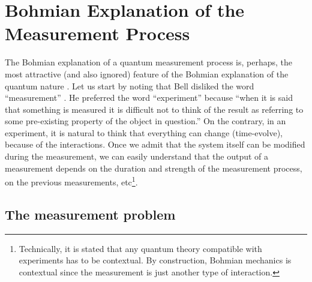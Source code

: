 \documentclass[nofootinbib, secnumarabic, amsmath, nobibnotes,11pt,aps,pra, floatfix]{revtex4-1}
\begin{document}
\section{Bohmian Explanation of the Measurement Process}\label{om.sec_measurement}

The Bohmian explanation of a quantum measurement process is, perhaps, the most attractive (and also ignored) feature of the Bohmian explanation of the quantum nature \cite{om.bell1990,om.Durrllibre,om.Goldsteinobserver,om.Bell1966,om.bomhhiley1993,om.reviewabc,om.llibreph}. Let us start by noting that Bell disliked the word ``measurement'' \cite{om.bell1990}. He preferred the word ``experiment'' because ``when it is said that something is measured it is difficult not to think of the result as referring to some pre-existing property of the object in question.'' On the contrary, in an experiment, it is natural to think that everything can change (time-evolve), because of the interactions. Once we admit that the system itself can be modified during the measurement, we can easily understand that the output of a measurement depends on the duration and strength of the measurement process, on the previous measurements, etc\footnote{Technically,  it is stated that any quantum theory compatible with experiments has to be contextual. By construction, Bohmian mechanics is contextual since the measurement is just another type of interaction.}.

\subsection{The measurement problem}\label{measpro}
\end{document}
